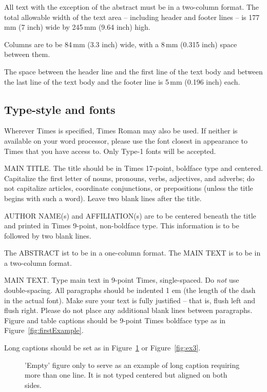 \documentclass{egpubl}
\begin{document}
All text with the exception of the abstract must be in a two-column format.
The total allowable width of the text area -- including header and footer
lines -- is 177\,mm (7 inch) wide by 245\,mm (9.64 inch) high.

Columns are to be 84\,mm (3.3 inch) wide, with a 8\,mm (0.315 inch) space 
between them.

The space between the header line and the first line of the text body and
between the last line of the text body and the footer line is 5\,mm
(0.196 inch) each.

\subsection{Type-style and fonts}

Wherever Times is specified, Times Roman may also be used. If
neither is available on your word processor, please use the font
closest in appearance to Times that you have access to. Only
Type-1 fonts will be accepted.

MAIN TITLE. The title should be in Times 17-point, boldface type and
centered. Capitalize the first letter of nouns, pronouns, verbs, adjectives,
and adverbs; do not capitalize articles, coordinate conjunctions, or
prepositions (unless the title begins with such a word). Leave two blank
lines after the title.

AUTHOR NAME(s) and AFFILIATION(s) are to be centered beneath the title and
printed in Times 9-point, non-boldface type. This information is to be
followed by two blank lines.

The ABSTRACT ist to be in a one-column format. The MAIN TEXT is to be in a
two-column format.

MAIN TEXT. Type main text in 9-point Times, single-spaced. Do \emph{not} use
double-spacing. All paragraphs should be indented 1 em (the length of the
dash in the actual font). Make sure your text is fully justified -- that is,
flush left and flush right. Please do not place any additional blank lines
between paragraphs. Figure and table captions should be 9-point Times
boldface type as in Figure~\ref{fig:firstExample}.

\noindent Long captions should be set as in Figure~\ref{fig:ex1} or
Figure~\ref{fig:ex3}.

\begin{figure}[htb]
   \caption{\label{fig:ex1}
     'Empty' figure only to serve as an example of long caption requiring 
     more than one line. It is not typed centered but aligned on both sides.}
\end{figure}
\end{document}
